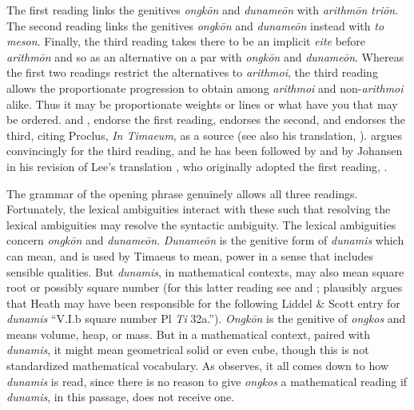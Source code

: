 The first reading links the genitives \emph{ongkōn} and \emph{dunameōn} with \emph{arithmōn triōn}. The second reading links the genitives \emph{ongkōn} and \emph{dunameōn} instead with \emph{to meson}. Finally, the third reading takes there to be an implicit \emph{eite} before \emph{arithmōn} and so as an alternative on a par with \emph{ongkōn} and \emph{dunameōn}. Whereas the first two readings restrict the alternatives to \emph{arithmoi}, the third reading allows the proportionate progression to obtain among \emph{arithmoi} and non-\emph{arithmoi} alike. Thus it may be proportionate weights or lines or what have you that may be ordered. \citet[97 n12]{Archer-Hind:1888qd} and \citet[59]{Bury:1929jb}, endorse the first reading, \citet[44]{Cornford:1935fk} endorses the second, and \citet[96--99]{Taylor:1928qb} endorses the third, citing Proclus, \emph{In Timaeum}, as a source (see also his translation, \citeyear[28]{Taylor:1929ov}). \citet{Prtichard:1990aa} argues convincingly for the third reading, and he has been followed by \citet{Zeyl:2000cs} and by Johansen in his revision of Lee's translation \citeyearpar{Lee:2008ca}, who originally adopted the first reading, \citeyearpar{Lee:1965fh}.

The grammar of the opening phrase genuinely allows all three readings. Fortunately, the lexical ambiguities interact with these such that resolving the lexical ambiguities may resolve the syntactic ambiguity. The lexical ambiguities concern \emph{ongkōn} and \emph{dunameōn}. \emph{Dunameōn} is the genitive form of \emph{dunamis} which can mean, and is used by Timaeus to mean, power in a sense that includes sensible qualities. But \emph{dunamis}, in mathematical contexts, may also mean square root or possibly square number (for this latter reading see \citealt[97 n12]{Archer-Hind:1888qd} and \citealt[294 n1]{Heath:1921ys}; \citealt[184]{Prtichard:1990aa} plausibly argues that Heath may have been responsible for the following Liddel \& Scott entry for \emph{dunamis} ``V.I.b square number Pl \emph{Ti} 32a.''). \emph{Ongkōn} is the genitive of \emph{ongkos} and means volume, heap, or mass. But in a mathematical context, paired with \emph{dunamis}, it might mean geometrical solid or even cube, though this is not standardized mathematical vocabulary. As \citet{Prtichard:1990aa} observes, it all comes down to how \emph{dunamis} is read, since there is no reason to give \emph{ongkos} a mathematical reading if \emph{dunamis}, in this passage, does not receive one. 

